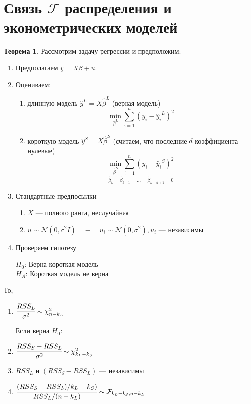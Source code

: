 \documentclass[12pt]{article} %
\theoremstyle{definition} %
\def \hb{\hat{\beta}}
\def \s{\sigma}
\def \hy{\hat{y}}
\def \cN{\mathcal{N}}
\def \cF{\mathcal{F}}
\def \cChi{\mathcal{\chi}}
\begin{document}
\section{Связь $\cF$ распределения и эконометрических моделей}
\newtheorem*{theo_n}{Теорема}
\begin{theo_n}
    Рассмотрим задачу регрессии  и предположим:
    \begin{enumerate}
        \item Предполагаем $y=X\beta+u$.
        \item Оцениваем:
        \begin{enumerate}
            \item длинную модель $\hy^L = X\hb^L$ (верная модель)
            \[
                \underset{\hb^L}{\min}\sum_{i=1}^n \left(y_i - {\hy_i}^L \right)^2
            \]
            \item короткую модель $\hy^S = X\hb^S$ (считаем, что последние $d$ коэффициента — нулевые)
            \[
                \underset{\hb_k=\hb_{k-1}=...=\hb_{k-d+1}=0}{\underset{\hb^S}{\min}\sum_{i=1}^n\left(y_i - {\hy_i}^S \right)^2}
            \] 
        \end{enumerate} 
        \item Стандартные предпосылки
        \begin{enumerate}
            \item $X$ — полного ранга, неслучайная
            \item  $u \sim \cN(0, \s^2I) \quad \equiv \quad u_i \sim \cN(0,\s^2), u_i$ — независимы
        \end{enumerate}
        \item Проверяем гипотезу
         \begin{center}
            $H_0$: Верна короткая модель \\
            \hspace{0.5cm}$H_A$: Короткая модель не верна
        \end{center}
    \end{enumerate}
    То,
    \begin{enumerate}
        \item $\cfrac{RSS_L}{\s^2}\sim \cChi_{n-k_L}^2$\par
        Если верна $H_0$:
        \item $\cfrac{RSS_S - RSS_L}{\s^2}\sim \cChi_{k_L - k_S}^2$ 
        \item $RSS_L \text{ и } (RSS_S - RSS_L)$ — независимы
        \item $\cfrac{(RSS_S - RSS_L)/k_L - k_S)}{RSS_L/(n-k_L)}\sim \cF_{k_L - k_S, n-k_L}$
    \end{enumerate}
\end{theo_n}
\end{document}
